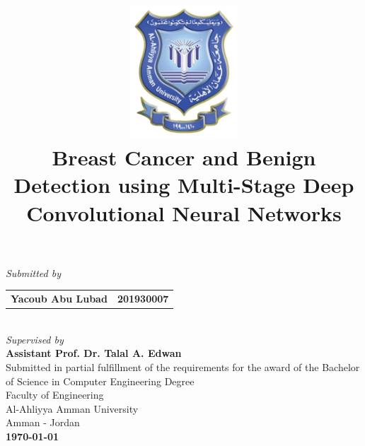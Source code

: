 \documentclass[12pt]{extarticle}
\title{\includegraphics[width=4cm]{pics/AAU_Logo.jpg}\\\Large{\textbf{Breast Cancer and Benign Detection using Multi-Stage Deep Convolutional Neural Networks}}
\date{}}
\begin{document}
	\clearpage\maketitle
	\begin{center}
		\vspace{-1.5cm}
		\large{\emph{Submitted by}}\\\vspace{0.5cm}
		\begin{tabular}{l l}
			
			\multicolumn{1}{p{6cm}}{ \large{\textbf{Yacoub Abu Lubad}}} &  \multicolumn{1}{p{6cm}}{\centering \large{\textbf{201930007}}} 
		\end{tabular}\\\vspace{1cm}
		\large{\emph{Supervised by}}\\\vspace{0.5cm}
		\large{\textbf{Assistant Prof. Dr. Talal A. Edwan}}\\\vspace{1cm}
		{Submitted in partial fulfillment of the requirements for the award of the Bachelor of Science in Computer Engineering Degree\\\vspace{1cm}
		Faculty of Engineering\\Al-Ahliyya Amman University\\Amman - Jordan}\\ \vspace{0.5cm}
		\Large{\textbf{\monthyeardate\today}}
		
		\thispagestyle{empty}
	\end{center}
	\newpage
	\setcounter{page}{1}
	
\end{document}
